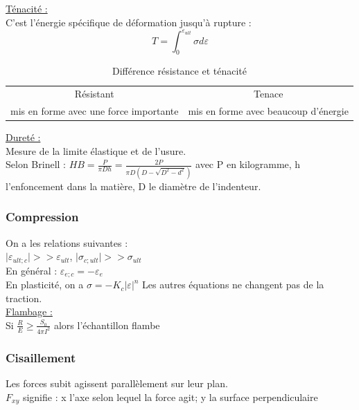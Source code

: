 \documentclass[../main.tex]{subfiles}
\begin{document}
\quad \underline{Ténacité :}\\
C'est l'énergie spécifique de déformation jusqu'à rupture :\\
\begin{equation}
    T = \int_0^{\varepsilon_{ult}} \sigma d\varepsilon
\end{equation}

\begin{table}[hbt!]
    \centering
    \begin{tabular}{c|c}
        Résistant & Tenace \\
        mis en forme avec une force importante & mis en forme avec beaucoup d'énergie
    \end{tabular}
    \caption{Différence résistance et ténacité}
\end{table}

\quad \underline{Dureté :}\\
Mesure de la limite élastique et de l'usure.\\
Selon Brinell : $HB = \frac{P}{\pi D h} = \frac{2P}{\pi D(D-\sqrt{D^2-d^2})}$ avec P en kilogramme, h l'enfoncement dans la matière, D le diamètre de l'indenteur.\\

\subsubsection{Compression}
On a les relations suivantes :\\
$\lvert \varepsilon_{ult;c}\rvert >>\varepsilon_{ult}$, $\lvert \sigma_{c;ult}\rvert >> \sigma_{ult}$\\
En général : $\varepsilon_{e;c} = -\varepsilon_e$\\
En plasticité, on a $\sigma = -K_c\lvert \varepsilon \rvert ^n$
Les autres équations ne changent pas de la traction.\\

\quad \underline{Flambage :}\\
Si $\frac{R}{E} \geq \frac{S_0}{4\pi I^2}$ alors l'échantillon flambe\\

\subsubsection{Cisaillement}
Les forces subit agissent parallèlement sur leur plan.\\
$F_{xy}$ signifie : x l'axe selon lequel la force agit; y la surface perpendiculaire\\
\end{document}
